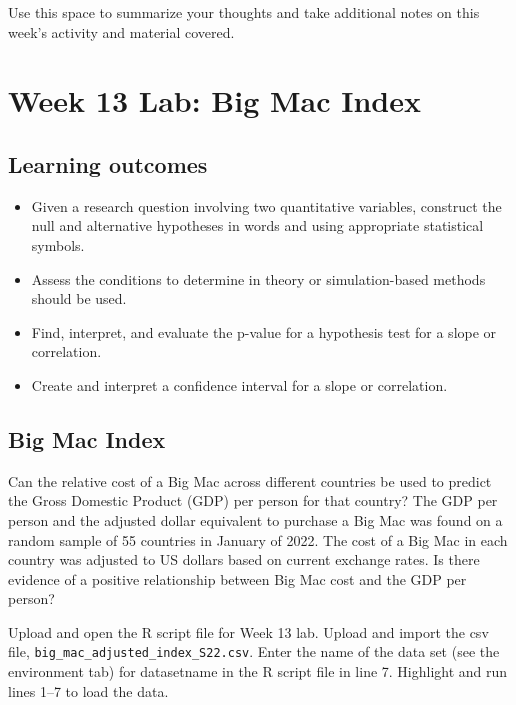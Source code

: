\documentclass[
]{report}
\begin{document}
Use this space to summarize your thoughts and take additional notes on this week's activity and material covered.

\newpage

\hypertarget{week-13-lab-big-mac-index}{%
\section{Week 13 Lab: Big Mac Index}\label{week-13-lab-big-mac-index}}


\hypertarget{learning-outcomes-10}{%
\subsection{Learning outcomes}\label{learning-outcomes-10}}

\begin{itemize}
\item
  Given a research question involving two quantitative variables, construct the null and alternative hypotheses
  in words and using appropriate statistical symbols.
\item
  Assess the conditions to determine in theory or simulation-based methods should be used.
\item
  Find, interpret, and evaluate the p-value for a hypothesis test for a slope or correlation.
\item
  Create and interpret a confidence interval for a slope or correlation.
\end{itemize}

\hypertarget{big-mac-index}{%
\subsection{Big Mac Index}\label{big-mac-index}}

Can the relative cost of a Big Mac across different countries be used to predict the Gross Domestic Product (GDP) per person for that country? The GDP per person and the adjusted dollar equivalent to purchase a Big Mac was found on a random sample of 55 countries in January of 2022. The cost of a Big Mac in each country was adjusted to US dollars based on current exchange rates. Is there evidence of a positive relationship between Big Mac cost and the GDP per person?

Upload and open the R script file for Week 13 lab. Upload and import the csv file, \texttt{big\_mac\_adjusted\_index\_S22.csv}. Enter the name of the data set (see the environment tab) for datasetname in the R script file in line 7. Highlight and run lines 1--7 to load the data.
\end{document}
